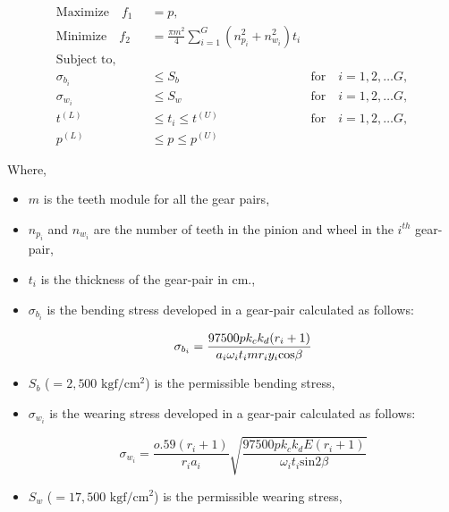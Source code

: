 \begin{singlespacing}
\begin{flushleft}


\begin{align}
\text{Maximize} \quad f_1 &=     \left. p,       \right.\nonumber\\
\text{Minimize} \quad f_2 &= \left. \frac{\pi m^2}{4} {\displaystyle\sum\limits_{i=1}^G {({n^2_{p_i}} + {n^2_{w_i}}) t_i }}\right.\nonumber\\
\text{Subject to,} \qquad & \left. \right.\nonumber\\
{\sigma}_{b_i} &\leqslant  S_b \quad  &\left. \text{for} \quad i = 1, 2, \dots G, \right.\nonumber\\
{\sigma}_{w_i} &\leqslant S_w \quad   &\left. \text{for} \quad i = 1, 2, \dots G, \right.\nonumber\\
t^{(L)} &\leqslant t_i \leqslant t^{(U)}   &\left. \text{for} \quad i = 1, 2, \dots G, \right.\nonumber\\
p^{(L)} &\leqslant p \leqslant p^{(U)} 
\end{align}

Where, 

\end{flushleft}

\begin{itemize}
\item $m$ is the teeth module for all the gear pairs,
\item $n_{p_i}$ and $n_{w_i}$ are the number of teeth in the pinion 
and wheel in the $i^{th}$ gear-pair,
\item $t_i$ is the thickness of the gear-pair in cm., 
\item ${\sigma}_{b_i}$ is the bending stress developed in a gear-pair 
calculated as follows:

\begin{equation}
\sigma_{b_{i}} = \frac{97500 p { } k_c { } k_d { } (r_i + 1)} {a_{ i} { } {\omega}_{ i} { } t_{ i} { } m { } r_{ i} { } y_{ i} { } \text{cos} \beta} \\
\end{equation}

\item $S_b$ ($= 2,500\text{ kgf}/\text{cm}^2$) is the permissible bending stress,

\item ${\sigma}_{w_i}$ is the wearing stress developed in a gear-pair
calculated as follows:

\begin{equation}
\sigma_{w_{i}} = \frac{o.59 (r_i+1)}{r_i a_i} \sqrt{\frac{97500 p { } k_c { } k_d { } E (r_i + 1)}{ {\omega}_i t_i \text{sin} 2 \beta}}
\end{equation}
\item $S_w$ ($= 17,500\text{ kgf}/\text{cm}^2$) is the permissible wearing stress,


\end{itemize}
\end{singlespacing}

